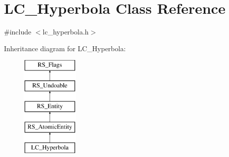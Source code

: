 \hypertarget{classLC__Hyperbola}{\section{L\-C\-\_\-\-Hyperbola Class Reference}
\label{classLC__Hyperbola}
}


{\ttfamily \#include $<$lc\-\_\-hyperbola.\-h$>$}

Inheritance diagram for L\-C\-\_\-\-Hyperbola\-:\begin{figure}[H]
\begin{center}
\leavevmode
\includegraphics[height=5.000000cm]{classLC__Hyperbola}
\end{center}
\end{figure}
